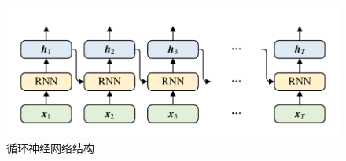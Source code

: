 \begin{figure}[htb]
	\centering
	\includegraphics[page=1, width=0.75\linewidth]{images/structure.pdf}
	\caption{循环神经网络结构}
	\label{fig:RNN}
\end{figure}